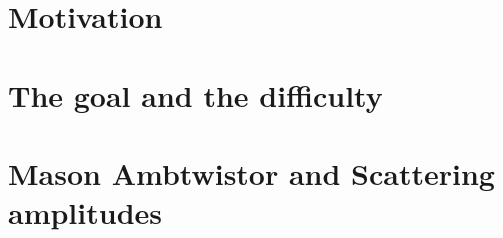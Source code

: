 



\section{Motivation}

\section{The goal and the difficulty }

\section{Mason Ambtwistor and Scattering amplitudes }
